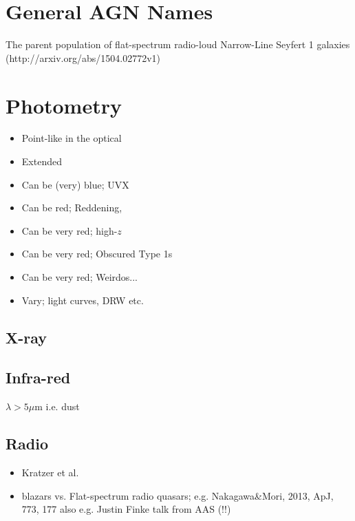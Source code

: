 \documentclass[usenatbib]{mn2e}
\begin{document}
\section{General AGN Names}
The parent population of flat-spectrum radio-loud Narrow-Line Seyfert 1 galaxies (http://arxiv.org/abs/1504.02772v1)

\section{Photometry} %
\begin{itemize}
    \item{Point-like in the optical}
    \item{Extended}
    \item{Can be (very) blue; UVX}
    \item{Can be red; Reddening, \citep{Krawczyk15}}
    \item{Can be very red; high-$z$}
    \item{Can be very red; Obscured Type 1s \citep{Banerji14}}
    \item{Can be very red; Weirdos...\citep{Ross6}}
    \item{Vary; light curves, DRW etc. \citet{MacLeod10, MacLeod11, MacLeod12, MacLeod12_AAS, MacLeod14}}
\end{itemize}
  
    \subsection{X-ray}    

    \subsection{Infra-red}   
    $\lambda>5\mu$m i.e. dust

    \subsection{Radio} 
    \begin{itemize}
      \item{Kratzer et al. }
      \item{blazars vs. Flat-spectrum radio quasars; e.g. Nakagawa\&Mori, 2013, ApJ, 773, 177 also e.g. Justin Finke talk from AAS (!!)  }
      \end{itemize}
\end{document}
